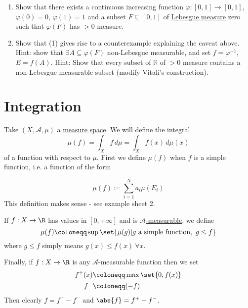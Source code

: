 \documentclass{article}
\newcommand{\1}[1]{\mathbbm{1}_{#1}}
\begin{document}
\begin{ex}\leavevmode
    \begin{enumerate}[label=(\arabic*)]
        \item Show that there exists a continuous increasing function $\varphi:[0,1] \to [0,1]$, $\varphi(0) = 0$, $\varphi(1) = 1$ and a subset $F \subseteq [0,1]$ of \hyperlink{def:lebMeas}{Lebesgue measure} zero such that $\varphi(F)$ has $> 0$ measure.
        \item Show that (1) gives rise to a counterexample explaining the caveat above. Hint: show that $\exists A \subseteq \varphi(F)$ non-Lebesgue measurable, and set $f = \varphi^{-1}$, $E = f(A)$.
            Hint: Show that every subset of $\mathbb{R}$ of $>0$ measure contains a non-Lebesgue measurable subset (modify Vitali's construction).
    \end{enumerate}
\end{ex}

\clearpage

\section{Integration}
Take $(X, \mathcal{A}, \mu)$ a \hyperlink{def:measureSpace}{measure space}.
We will define the integral
\begin{equation*}
    \mu(f) = \int_X f \, d\mu = \int_X f(x) \, d\mu(x)
\end{equation*}
of a function with respect to $\mu$.
First we define $\mu(f)$ when $f$ is a simple function, i.e. a function of the form
\begin{defi}
    \begin{equation*}
        \mu(f) \coloneqq \sum_{i=1}^N a_i \mu(E_i)
    \end{equation*}
    This definition makes sense - see example sheet 2.
\end{defi}
\begin{defi}
    If $f: X \to \R$ has values in $[0, +\infty]$ and is \hyperlink{def:measurableFunctoR}{$\mathcal{A}$-measurable}, we define
    \begin{equation*}
        \mu(f) \coloneqq \sup\set{\mu(g) | g \text{ a simple function},\  g \leq f}
    \end{equation*}
    where $g \leq f$ simply means $g(x) \leq f(x) \ \forall x$.
\end{defi}
Finally, if $f: X \to \R$ is any $\mathcal{A}$-measurable function then we set
\begin{align*}
    f^+(x) &\coloneqq \max\set{0, f(x)} \\
    f^- &\coloneqq (-f)^+
\end{align*}
Then clearly $f = f^+ - f^-$ and $\abs{f} = f^+ + f^-$.
\end{document}
